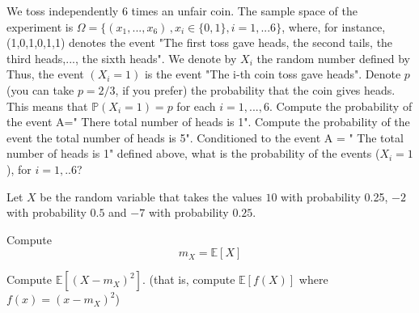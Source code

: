 \begin{ExerciseList}
	\Exercise We toss independently 6 times an unfair coin. The sample space of the experiment is $\Omega=\{(x_1,...,x_6)\,, x_i\in\{0,1\}, i=1,...6\}$, where, for instance, (1,0,1,0,1,1) denotes the event "The first toss gave heads, the second tails, the third heads,..., the sixth heads". We denote by $X_i$ the random number defined by 
Thus, the event $(X_i=1)$ is the event "The i-th coin toss gave heads". 
Denote $p$ (you can take $p=2/3$, if you prefer) the probability that the coin gives heads. This means that $\mathbb{P}(X_i=1)=p$ for each $i=1,...,6$.
    \Question Compute the probability of the event A=" There total number of heads is 1".  
    \Question Compute the probability of the event the total number of heads is 5". 
    \Question Conditioned to the event A = " The total number of heads is 1" defined above, what is the probability of the events 
    ($X_i=1$), for $i=1,..6$? 

	 \Exercise Let $X$ be the random variable that takes the values $10$  with probability 0.25, $-2$ with probability $0.5$ and $-7$ with probability $0.25$.
  
        \Question Compute
    $$m_X = \mathbb E[X]$$
    
    \Question Compute 
    $\mathbb E[( X - m_X)^2]$. (that is, compute $\mathbb E[f(X)]$ where $f(x) = (x- m_X)^2$) 


\end{ExerciseList}


